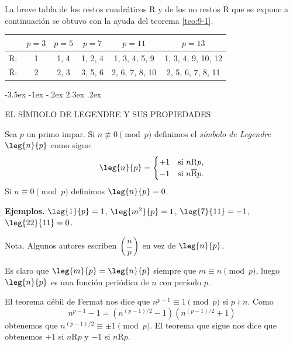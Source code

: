 \documentclass[12pt,a4paper]{book}
\makeatletter
\renewcommand\section{\@startsection{section}{1}{\z@}%
  {-3.5ex \@plus -1ex \@minus -.2ex}%
  {2.3ex \@plus .2ex}%
  {\normalfont\Large\bfseries\raggedright}}
\makeatother
\begin{document}
    La breve tabla de los restos cuadráticos $\mathrm{R}$ y de los no restos
    $\overline{\mathrm{R}}$ que se expone a continuación se obtuvo con la ayuda del
    teorema \ref{teo:9-1}.

    \begin{center}
        \begin{tabular}{c|ccccc}
            &$p=3$&$p=5$&$p=7$&$p=11$&$p=13$\\\hline
            $\mathrm{R}:$&1&1, 4&1, 2, 4&1, 3, 4, 5, 9&1, 3, 4, 9, 10, 12\\
            $\overline{\mathrm{R}}:$&2&2, 3&3, 5, 6&2, 6, 7, 8, 10&2, 5, 6, 7, 8, 11
        \end{tabular}
    \end{center}

    \section{EL SÍMBOLO DE LEGENDRE Y SUS PROPIEDADES}\label{sim:leg}
    \begin{definicion}
        Sea $p$ un primo impar. Si $n\not\equiv0\pmod{p}$ definimos el \textit{símbolo de
        Legendre} $\leg{n}{p}$ como sigue:
        \begin{equation*}
            \leg{n}{p}=
            \begin{cases}
                +1&\text{si }n\mathrm{R}p,\\
                -1&\text{si }n\overline{\mathrm{R}}p.
            \end{cases}
        \end{equation*}
        Si $n\equiv0\pmod{p}$ definimos $\leg{n}{p}=0$.
    \end{definicion}

    \textbf{Ejemplos.} $\leg{1}{p}=1$, $\leg{m^{2}}{p}=1$, $\leg{7}{11}=-1$,
    $\leg{22}{11}=0$.

    Nota. Algunos autores escriben $\left(\dfrac{n}{p}\right)$ en vez de $\leg{n}{p}$.

    Es claro que $\leg{m}{p}=\leg{n}{p}$ siempre que $m\equiv n\pmod{p}$, luego $\leg{n}{p}$
    es una función periódica de $n$ con período $p$.

    El teorema débil de Fermat nos dice que $n^{p-1}\equiv1\pmod{p}$ si $p\nmid n$. Como
    \begin{equation*}
        n^{p-1}-1=\left(n^{(p-1)/2}-1\right)\left(n^{(p-1)/2}+1\right)
    \end{equation*}
    obtenemos que $n^{(p-1)/2}\equiv\pm1\pmod{p}$. El teorema que sigue nos dice que
    obtenemos $+1$ si $n\mathrm{R}p$ y $-1$ si $n\overline{\mathrm{R}}p$.
\end{document}
